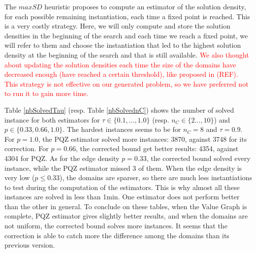 \documentclass[jair,twoside,11pt,theapa]{article}
\newcommand{\major}[1]{\textcolor{red}{#1}}
\begin{document}
The $maxSD$ heuristic proposes to compute an estimator of the solution density, for each possible remaining instantiation, each time a fixed point is reached. This is a very costly strategy. Here, we will only compute and store the solution densities in the beginning of the search and each time we reach a fixed point, we will refer to them and choose the instantiation that led to the highest solution density at the beginning of the search and that is still available.  \major{We also thought about updating the solution densities each time the size of the domains have decreased enough (have reached a certain threshold), like proposed in (REF). This strategy is not effective on our generated problem, so we have preferred not to run it to gain more time.}







Table \ref{nbSolvedTau} (resp. Table \ref{nbSolvednC}) shows the number of solved instance for both estimators for $\tau \in \lbrace 0.1, \ldots, 1.0 \rbrace$ (resp. $n_C \in \lbrace 2 \ldots, 10 \rbrace$) and $p \in \lbrace 0.33, 0.66, 1.0 \rbrace$. The hardest instances seems to be for $n_C=8$ and $\tau=0.9$. For $p=1.0$, the PQZ estimator solved more instances: 3870, against 3748 for its correction. For $p=0.66$, the corrected bound get better results: 4354, against 4304 for PQZ. As for the edge density $p=0.33$, the corrected bound solved every instance, while the PQZ estimator missed 3 of them. When the edge density is very low ($p\leq 0.33$), the domains are sparser, so there are much less instantiations to test during the computation of the estimators. This is why almost all these instances are solved in less than 1min. One estimator does not perform better than the other in general. To conclude on these tables, when the Value Graph is complete, PQZ estimator gives slightly better results, and when the domains are not uniform, the corrected bound solves more instances. It seems that the correction is able to catch more the difference among the domains than its previous version.
\end{document}

